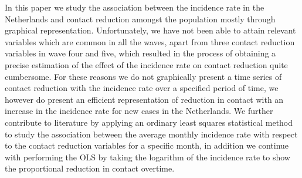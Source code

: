 \documentclass[12pt, a4paper, oneside]{scrartcl}
\begin{document}
In this paper we study the association between the incidence rate in the Netherlands and contact reduction amongst the population mostly through graphical representation. Unfortunately, we have not been able to attain relevant variables which are common in all the waves, apart from three contact reduction variables in wave four and five, which resulted in the process of obtaining a precise estimation of the effect of the incidence rate on contact reduction quite cumbersome. For these reasons we do not graphically present a time series of contact reduction with the incidence rate over a specified period of time, we however do present an efficient representation of reduction in contact with an increase in the incidence rate for new cases in the Netherlands. We further contribute to literature by applying an ordinary least squares statistical method to study the association between the average monthly incidence rate with respect to the contact reduction variables for a specific month, in addition we continue with performing the OLS by taking the logarithm of the incidence rate to  show the proportional reduction in contact overtime. 
\end{document}
